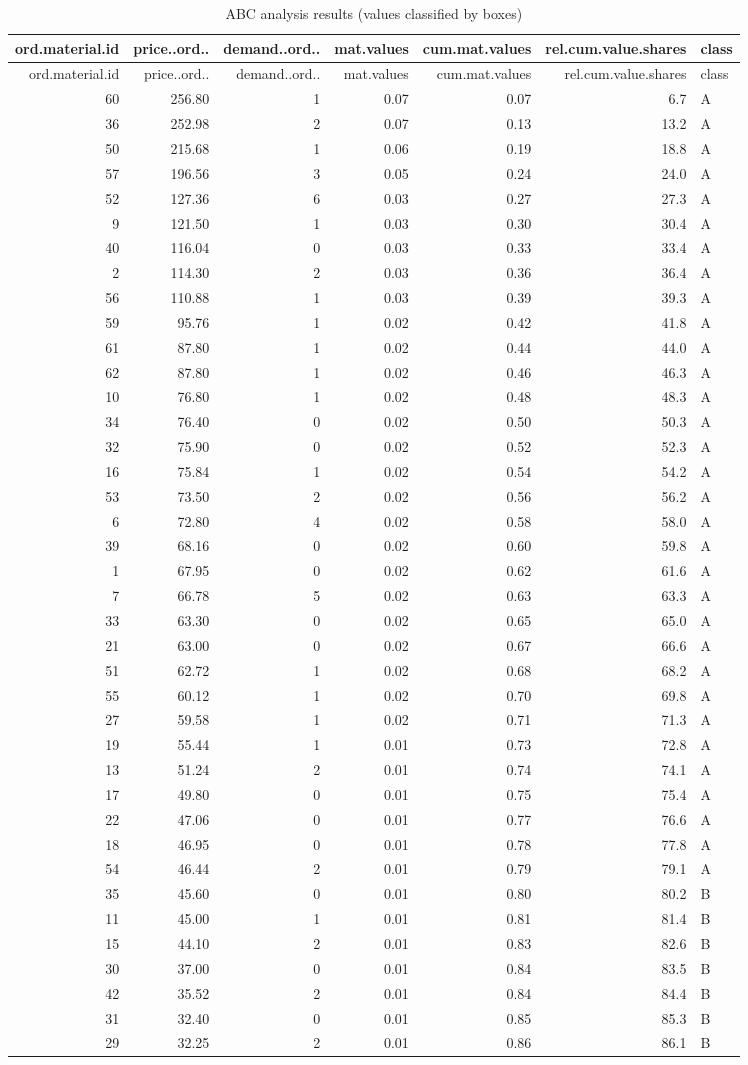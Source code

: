 \documentclass[
]{article}
\begin{document}
\begin{longtable}[]{@{}rrrrrrl@{}}
\caption{ABC analysis results (values classified by
boxes)}\tabularnewline
\toprule
ord.material.id & price..ord.. & demand..ord.. & mat.values &
cum.mat.values & rel.cum.value.shares & class\tabularnewline
\midrule
\endfirsthead
\toprule
ord.material.id & price..ord.. & demand..ord.. & mat.values &
cum.mat.values & rel.cum.value.shares & class\tabularnewline
\midrule
\endhead
60 & 256.80 & 1 & 0.07 & 0.07 & 6.7 & A\tabularnewline
36 & 252.98 & 2 & 0.07 & 0.13 & 13.2 & A\tabularnewline
50 & 215.68 & 1 & 0.06 & 0.19 & 18.8 & A\tabularnewline
57 & 196.56 & 3 & 0.05 & 0.24 & 24.0 & A\tabularnewline
52 & 127.36 & 6 & 0.03 & 0.27 & 27.3 & A\tabularnewline
9 & 121.50 & 1 & 0.03 & 0.30 & 30.4 & A\tabularnewline
40 & 116.04 & 0 & 0.03 & 0.33 & 33.4 & A\tabularnewline
2 & 114.30 & 2 & 0.03 & 0.36 & 36.4 & A\tabularnewline
56 & 110.88 & 1 & 0.03 & 0.39 & 39.3 & A\tabularnewline
59 & 95.76 & 1 & 0.02 & 0.42 & 41.8 & A\tabularnewline
61 & 87.80 & 1 & 0.02 & 0.44 & 44.0 & A\tabularnewline
62 & 87.80 & 1 & 0.02 & 0.46 & 46.3 & A\tabularnewline
10 & 76.80 & 1 & 0.02 & 0.48 & 48.3 & A\tabularnewline
34 & 76.40 & 0 & 0.02 & 0.50 & 50.3 & A\tabularnewline
32 & 75.90 & 0 & 0.02 & 0.52 & 52.3 & A\tabularnewline
16 & 75.84 & 1 & 0.02 & 0.54 & 54.2 & A\tabularnewline
53 & 73.50 & 2 & 0.02 & 0.56 & 56.2 & A\tabularnewline
6 & 72.80 & 4 & 0.02 & 0.58 & 58.0 & A\tabularnewline
39 & 68.16 & 0 & 0.02 & 0.60 & 59.8 & A\tabularnewline
1 & 67.95 & 0 & 0.02 & 0.62 & 61.6 & A\tabularnewline
7 & 66.78 & 5 & 0.02 & 0.63 & 63.3 & A\tabularnewline
33 & 63.30 & 0 & 0.02 & 0.65 & 65.0 & A\tabularnewline
21 & 63.00 & 0 & 0.02 & 0.67 & 66.6 & A\tabularnewline
51 & 62.72 & 1 & 0.02 & 0.68 & 68.2 & A\tabularnewline
55 & 60.12 & 1 & 0.02 & 0.70 & 69.8 & A\tabularnewline
27 & 59.58 & 1 & 0.02 & 0.71 & 71.3 & A\tabularnewline
19 & 55.44 & 1 & 0.01 & 0.73 & 72.8 & A\tabularnewline
13 & 51.24 & 2 & 0.01 & 0.74 & 74.1 & A\tabularnewline
17 & 49.80 & 0 & 0.01 & 0.75 & 75.4 & A\tabularnewline
22 & 47.06 & 0 & 0.01 & 0.77 & 76.6 & A\tabularnewline
18 & 46.95 & 0 & 0.01 & 0.78 & 77.8 & A\tabularnewline
54 & 46.44 & 2 & 0.01 & 0.79 & 79.1 & A\tabularnewline
35 & 45.60 & 0 & 0.01 & 0.80 & 80.2 & B\tabularnewline
11 & 45.00 & 1 & 0.01 & 0.81 & 81.4 & B\tabularnewline
15 & 44.10 & 2 & 0.01 & 0.83 & 82.6 & B\tabularnewline
30 & 37.00 & 0 & 0.01 & 0.84 & 83.5 & B\tabularnewline
42 & 35.52 & 2 & 0.01 & 0.84 & 84.4 & B\tabularnewline
31 & 32.40 & 0 & 0.01 & 0.85 & 85.3 & B\tabularnewline
29 & 32.25 & 2 & 0.01 & 0.86 & 86.1 & B\tabularnewline

\end{longtable}
\end{document}
